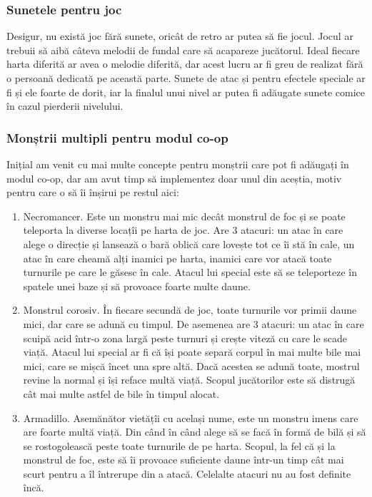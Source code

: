 \documentclass[12pt, a4paper]{article}
\begin{document}
	
	
	
	\subsubsection{Sunetele pentru joc}
	
	Desigur, nu există joc fără sunete, oricât de retro ar putea să fie jocul. Jocul ar trebuii să aibă câteva melodii de fundal care să acapareze jucătorul. Ideal fiecare harta diferită ar avea o melodie diferită, dar acest lucru ar fi greu de realizat fără o persoană dedicată pe această parte. Sunete de atac și pentru efectele speciale ar fi și ele foarte de dorit, iar la finalul unui nivel ar putea fi adăugate sunete comice în cazul pierderii nivelului.
	
	
	
	
	
	\subsubsection{Monștrii multipli pentru modul co-op}
	
	Inițial am venit cu mai multe concepte pentru monștrii care pot fi adăugați în modul co-op, dar am avut timp să implementez doar unul din aceștia, motiv pentru care o să îi înșirui pe restul aici:
	
	\begin{enumerate}
		\item Necromancer. Este un monstru mai mic decât monstrul de foc și se poate teleporta la diverse locațîi pe harta de joc. Are 3 atacuri: un atac în care alege o direcție și lansează o bară oblică care lovește tot ce îi stă în cale, un atac în care cheamă alți inamici pe harta, inamici care vor atacă toate turnurile pe care le găsesc în cale. Atacul lui special este să se teleporteze în spatele unei baze și să provoace foarte multe daune.
		\item Monstrul corosiv. În fiecare secundă de joc, toate turnurile vor primii daune mici, dar care se adună cu timpul. De asemenea are 3 atacuri: un atac în care scuipă acid într-o zona largă peste turnuri și crește viteză cu care le scade viață. Atacul lui special ar fi că își poate separă corpul în mai multe bile mai mici, care se mișcă încet una spre altă. Dacă acestea se adună toate, mostrul revine la normal și își reface multă viață. Scopul jucătorilor este să distrugă cât mai multe astfel de bile în timpul alocat.
		\item Armadillo. Asemănător vietățîi cu același nume, este un monstru imens care are foarte multă viață. Din când în când alege să se facă în formă de bilă și să se rostogolească peste toate turnurile de pe harta. Scopul, la fel că și la monstrul de foc, este să îi provoace suficiente daune într-un timp cât mai scurt pentru a îl întrerupe din a atacă. Celelalte atacuri nu au fost definite încă.
	\end{enumerate}
	
\end{document}
